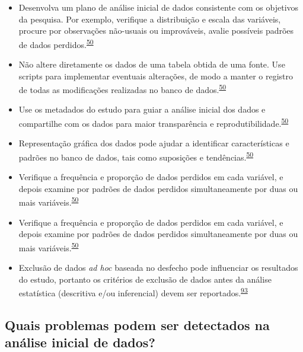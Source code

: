 \documentclass[
  a4paper,
]{book}
\begin{document}
\begin{itemize}
\item
  Desenvolva um plano de análise inicial de dados consistente com os objetivos da pesquisa. Por exemplo, verifique a distribuição e escala das variáveis, procure por observações não-usuais ou improváveis, avalie possíveis padrões de dados perdidos.\textsuperscript{\protect\hyperlink{ref-Baillie2022}{50}}
\item
  Não altere diretamente os dados de uma tabela obtida de uma fonte. Use scripts para implementar eventuais alterações, de modo a manter o registro de todas as modificações realizadas no banco de dados.\textsuperscript{\protect\hyperlink{ref-Baillie2022}{50}}
\item
  Use os metadados do estudo para guiar a análise inicial dos dados e compartilhe com os dados para maior transparência e reprodutibilidade.\textsuperscript{\protect\hyperlink{ref-Baillie2022}{50}}
\item
  Representação gráfica dos dados pode ajudar a identificar características e padrões no banco de dados, tais como suposições e tendências.\textsuperscript{\protect\hyperlink{ref-Baillie2022}{50}}
\item
  Verifique a frequência e proporção de dados perdidos em cada variável, e depois examine por padrões de dados perdidos simultaneamente por duas ou mais variáveis.\textsuperscript{\protect\hyperlink{ref-Baillie2022}{50}}
\item
  Verifique a frequência e proporção de dados perdidos em cada variável, e depois examine por padrões de dados perdidos simultaneamente por duas ou mais variáveis.\textsuperscript{\protect\hyperlink{ref-Baillie2022}{50}}
\item
  Exclusão de dados \emph{ad hoc} baseada no desfecho pode influenciar os resultados do estudo, portanto os critérios de exclusão de dados antes da análise estatística (descritiva e/ou inferencial) devem ser reportados.\textsuperscript{\protect\hyperlink{ref-Landis2012}{93}}
\end{itemize}

\hypertarget{quais-problemas-podem-ser-detectados-na-anuxe1lise-inicial-de-dados}{%
\subsection{Quais problemas podem ser detectados na análise inicial de dados?}\label{quais-problemas-podem-ser-detectados-na-anuxe1lise-inicial-de-dados}}
\end{document}
